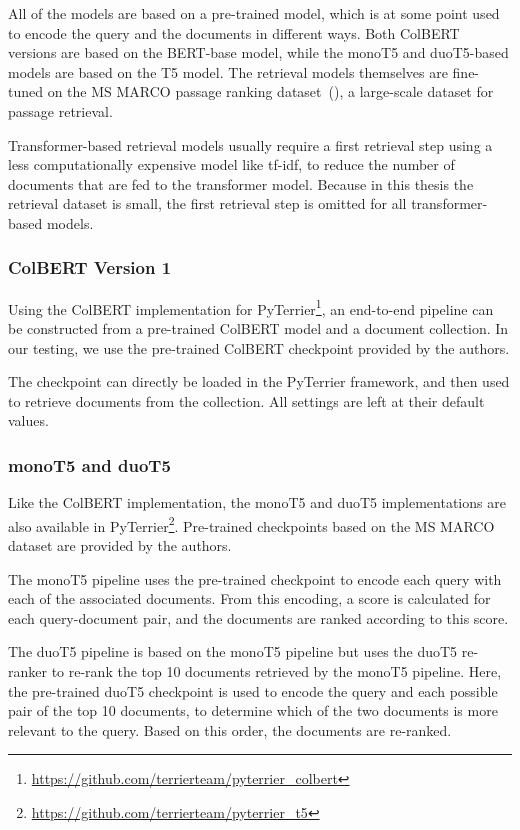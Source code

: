 All of the models are based on a pre-trained model, which is at some point used to encode the query and the documents in different ways.
Both ColBERT versions are based on the BERT-base model, while the monoT5 and duoT5-based models are based on the T5 model.
The retrieval models themselves are fine-tuned on the MS MARCO passage ranking dataset~(\cite{bajaj:2016:MSMARCO}), a large-scale dataset for passage retrieval.

Transformer-based retrieval models usually require a first retrieval step using a less computationally expensive model like tf-idf, to reduce the number of documents that are fed to the transformer model.
Because in this thesis the retrieval dataset is small, the first retrieval step is omitted for all transformer-based models.

\subsubsection{ColBERT Version 1}
Using the ColBERT implementation for PyTerrier\footnote{\url{https://github.com/terrierteam/pyterrier_colbert}}, an end-to-end pipeline can be constructed from a pre-trained ColBERT model and a document collection.
In our testing, we use the pre-trained ColBERT checkpoint provided by the authors.

The checkpoint can directly be loaded in the PyTerrier framework, and then used to retrieve documents from the collection.
All settings are left at their default values.

\subsubsection{monoT5 and duoT5}
Like the ColBERT implementation, the monoT5 and duoT5 implementations are also available in PyTerrier\footnote{\url{https://github.com/terrierteam/pyterrier_t5}}.
Pre-trained checkpoints based on the MS MARCO dataset are provided by the authors.

The monoT5 pipeline uses the pre-trained checkpoint to encode each query with each of the associated documents.
From this encoding, a score is calculated for each query-document pair, and the documents are ranked according to this score.

The duoT5 pipeline is based on the monoT5 pipeline but uses the duoT5 re-ranker to re-rank the top 10 documents retrieved by the monoT5 pipeline.
Here, the pre-trained duoT5 checkpoint is used to encode the query and each possible pair of the top 10 documents, to determine which of the two documents is more relevant to the query.
Based on this order, the documents are re-ranked.

